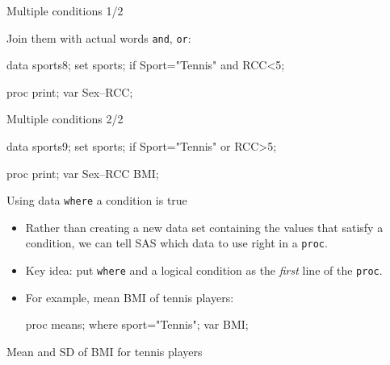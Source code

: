 \documentclass[unknownkeysallowed]{beamer}\usepackage[]{graphicx}\usepackage[]{color}
\begin{document}
\begin{frame}[fragile]{Multiple conditions 1/2}
  
  Join them with actual words \texttt{and}, \texttt{or}:
  
  \begin{Datastep}
data sports8;
  set sports;
  if Sport="Tennis" and RCC<5;
  \end{Datastep}
  
  \begin{Sascode}[store=th]
proc print;
  var Sex--RCC;
  \end{Sascode}
  
  
\end{frame}

\begin{frame}[fragile]{Multiple conditions 2/2}
  
  \begin{Datastep}
data sports9;
  set sports;
  if Sport="Tennis" or RCC>5;
  \end{Datastep}
  
  \begin{Sascode}[store=ti]
proc print;
  var Sex--RCC BMI;
  \end{Sascode}
  
\end{frame}

\begin{frame}[fragile]{Using data \texttt{where} a condition is true}
  
  \begin{itemize}
  \item Rather than creating a new data set containing the values that
    satisfy a condition, we can tell SAS which data to use right in a
    \texttt{proc}.
  \item Key idea: put \texttt{where} and a logical condition as the
    \emph{first} line of the \texttt{proc}.
  \item For example, mean BMI of tennis players:
    \begin{Sascode}[store=zawis]
proc means;
  where sport="Tennis";
  var BMI;
    \end{Sascode}
  \end{itemize}
  
\end{frame}

\begin{frame}[fragile]{Mean and SD of BMI for tennis players}
  
  
\end{frame}
\end{document}
